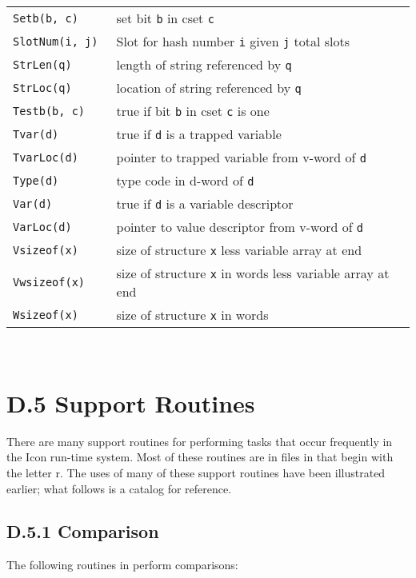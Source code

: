 {\begin{xtabular}{>{\hspace{1cm}\texttt\bgroup}l<{\egroup}@{\hspace{1cm}}p{11cm}}
Setb(b, c)        & set bit \texttt{b} in cset \texttt{c}\\
SlotNum(i, j)     & Slot for hash number \texttt{i} given \texttt{j} total slots\\
StrLen(q)         & length of string referenced by \texttt{q}\\
StrLoc(q)         & location of string referenced by \texttt{q}\\
Testb(b, c)       & true if bit \texttt{b} in cset \texttt{c} is one\\
Tvar(d)           & true if \texttt{d} is a trapped variable\\
TvarLoc(d)        & pointer to trapped variable from v-word of \texttt{d}\\
Type(d)           & type code in d-word of \texttt{d}\\
Var(d)            & true if \texttt{d} is a variable descriptor\\
VarLoc(d)         & pointer to value descriptor from v-word of \texttt{d}\\
Vsizeof(x)        & size of structure \texttt{x} less variable array at end\\
Vwsizeof(x)       & size of structure \texttt{x} in words less variable array at end\\
Wsizeof(x)        & size of structure \texttt{x} in words\\
\end{xtabular}
}\\[1ex]

\section[D.5 Support Routines]{D.5 Support Routines}

There are many support routines for performing tasks that occur frequently in
the Icon run-time system. Most of these routines are in files in 
that begin with the letter r. The uses of many of these support routines have
been illustrated earlier; what follows is a catalog for reference.

\subsection[D.5.1 Comparison]{D.5.1 Comparison}

The following routines in  perform comparisons:

